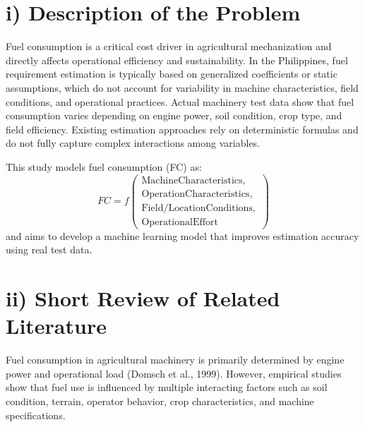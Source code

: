 \documentclass[11pt,twocolumn]{article}
\begin{document}

\section*{\small i) Description of the Problem}

Fuel consumption is a critical cost driver in agricultural mechanization and directly affects operational efficiency and sustainability. In the Philippines, fuel requirement estimation is typically based on generalized coefficients or static assumptions, which do not account for variability in machine characteristics, field conditions, and operational practices.
\vspace{10pt}
Actual machinery test data show that fuel consumption varies depending on engine power, soil condition, crop type, and field efficiency. Existing estimation approaches rely on deterministic formulas and do not fully capture complex interactions among variables.

\vspace{10pt}

This study models fuel consumption (FC) as:
{\small
\[
FC = f\!\left(
\begin{array}{l}
\mathrm{Machine Characteristics,}\\
\mathrm{Operation Characteristics,}\\
\mathrm{Field/Location Conditions,}\\
\mathrm{Operational Effort}
\end{array}
\right)
\]
}and aims to develop a machine learning model that improves estimation accuracy using real test data.

\section*{\small ii) Short Review of Related Literature}

Fuel consumption in agricultural machinery is primarily determined by engine power and operational load (Domsch et al., 1999). However, empirical studies show that fuel use is influenced by multiple interacting factors such as soil condition, terrain, operator behavior, crop characteristics, and machine specifications.
\end{document}
